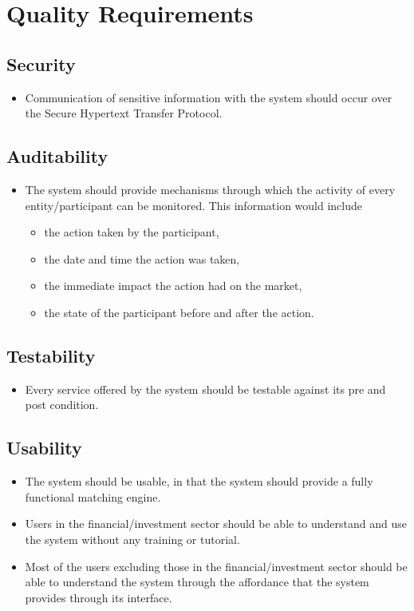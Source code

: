 \documentclass[12pt]{article}
\begin{document}
	\section{Quality Requirements}
		\subsection{Security}
		\begin{itemize}
		\item Communication of sensitive information with the system should occur over the Secure Hypertext Transfer Protocol.
		\end{itemize}
		\subsection{Auditability}
		\begin{itemize}
		\item The system should provide mechanisms through which the activity of every entity/participant can be monitored. This information would include
			\begin{itemize}
			\item the action taken by the participant, 
			\item the date and time the action was taken, 
			\item the immediate impact the action had on the market,
			\item the state of the participant before and after the action.
			\end{itemize}
		\end{itemize}
		\subsection{Testability}
		\begin{itemize}
		\item Every service offered by the system should be testable against its pre and post condition.
		\end{itemize}
		\subsection{Usability}
		\begin{itemize}
		\item The system should be usable, in that the system should provide a fully functional matching engine.
		\item Users in the financial/investment sector should be able to understand and use the system without any training or tutorial.
		\item Most of the users excluding those in the financial/investment sector should be able to understand the system through the affordance that the system provides through its interface.
		\end{itemize}
\end{document}
